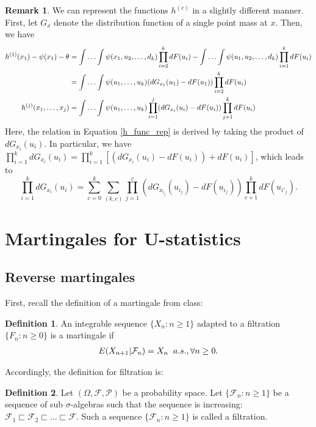 \documentclass{article}
\theoremstyle{definition}
\newtheorem{Def}{Definition}
\numberwithin{Def}{section}
\newtheorem{Rmk}{Remark}
\begin{document}
\begin{Rmk}
We can represent the functions $h^{(c)}$ in a slightly different manner. First, let $G_x$ denote the distribution function of a single point mass at $x$. Then, we have 
\begin{align}
    h^{(1)}(x_1) - \psi(x_1) - \theta  &= \int \dotsc \int \psi(x_1, u_2, \dotsc, d_k)\prod_{i=2}^k dF(u_i) - \int \dotsc \int \psi(u_1, u_2, \dotsc, d_k)\prod_{i=1}^k dF(u_i) \notag \\
    &= \int \dotsc \int \psi(u_1, \dotsc, u_k)(dG_{x_1}(u_1) - dF(u_1))\prod_{i=2}^k dF(u_i) \notag \\
    h^{(j)}(x_1, \dotsc, x_j) &= \int \dotsc \int \psi(u_1, \dotsc, u_k) \prod_{i=1}^j(dG_{x_i}(u_i) - dF(u_i))\prod_{j+1}^kdF(u_i) \label{h_func_rep}
\end{align}
Here, the relation in Equation \ref{h_func_rep} is derived by taking the product of $dG_{x_i}(u_i)$. In particular, we have $\prod_{i=1}^kdG_{x_i}(u_i) = \prod_{i=1}^k\left[(dG_{x_i}(u_i) - dF(u_i)) + dF(u_i) \right]$, which leads to $$\prod_{i=1}^kdG_{x_i}(u_i) = \sum_{c=0}^k \sum_{(k,c)}\prod_{j=1}^c\left(dG_{x_{i_j}}(u_{i_j}) - dF(u_{i_j})\right)\prod_{c+1}^k dF(u_{i'_j}).$$
\end{Rmk}
\section{Martingales for U-statistics}
\subsection{Reverse martingales}
First, recall the definition of a martingale from class:
\begin{Def}
An integrable sequence $\{X_n: n\ge 1\}$ adapted to a filtration $\{F_n: n\ge 0\}$ is a martingale if
\begin{align*}
 E(X_{n+1}|\mathcal{F}_n)=X_n \hspace{0.2cm} a.s., \forall n\ge0.
\end{align*}
\end{Def}

Accordingly, the definition for filtration is:
\begin{Def}
Let $(\Omega, \mathcal{F}, \mathcal{P})$ be a probability space. Let $\{\mathcal{F}_n: n\ge1\}$ be a sequence of sub $\sigma$-algebras such that the sequence is increasing: $\mathcal{F}_1 \sqsubset \mathcal{F}_2 \sqsubset \dotsc \sqsubset \mathcal{F}$. Such a sequence $\{\mathcal{F}_n: n\ge1\}$ is called a filtration. 
\end{Def}
\end{document}
